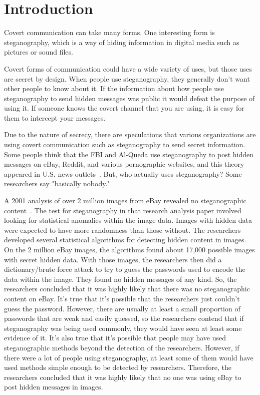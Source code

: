 \section{Introduction}
	Covert communication can take many forms. One interesting form is steganography, which is a way of hiding information in digital media such as pictures or sound files.

	Covert forms of communication could have a wide variety of uses, but those uses are secret by design. When people use steganography, they generally don't want other people to know about it. If the information about how people use steganography to send hidden messages was public it would defeat the purpose of using it. If someone knows the covert channel that you are using, it is easy for them to intercept your messages. 

	Due to the nature of secrecy, there are speculations that various organizations are using covert communication such as steganography to send secret information. Some people think that the FBI and Al-Queda use steganography to post hidden messages on eBay, Reddit, and various pornographic websites, and this theory appeared in U.S. news outlets~\cite{cnn}. But, who actually uses steganography? Some researchers say "basically nobody."

	A 2001 analysis of over 2 million images from eBay revealed no steganographic content~\cite{provos}. The test for steganography in that research analysis paper involved looking for statistical anomalies within the image data. Images with hidden data were expected to have more randomness than those without. The researchers developed several statistical algorithms for detecting hidden content in images. On the 2 million eBay images, the algorithms found about 17,000 possible images with secret hidden data. With those images, the researchers then did a dictionary/brute force attack to try to guess the passwords used to encode the data within the image. They found no hidden messages of any kind. So, the researchers concluded that it was highly likely that there was no steganographic content on eBay. It's true that it's possible that the researchers just couldn't guess the password. However, there are usually at least a small proportion of passwords that are weak and easily guessed, so the researchers contend that if steganography was being used commonly, they would have seen at least some evidence of it. It's also true that it's possible that people may have used steganographic methods beyond the detection of the researchers. However, if there were a lot of people using steganography, at least some of them would have used methods simple enough to be detected by researchers. Therefore, the researchers concluded that it was highly likely that no one was using eBay to post hidden messages in images.


